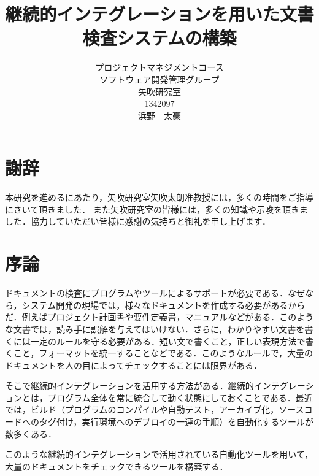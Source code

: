 \title{継続的インテグレーションを用いた文書検査システムの構築}
\author{プロジェクトマネジメントコース\\
ソフトウェア開発管理グループ\\
矢吹研究室\\
1342097\\
浜野　太豪}
\date{}

\maketitle



\chapter*{謝辞}

本研究を進めるにあたり，矢吹研究室矢吹太朗准教授には，多くの時間をご指導にさいて頂きました．
また矢吹研究室の皆様には，多くの知識や示唆を頂きました．協力していただい皆様に感謝の気持ちと御礼を申し上げます．

\tableofcontents%


\chapter{序論}
ドキュメントの検査にプログラムやツールによるサポートが必要である．なぜなら，システム開発の現場では，様々なドキュメントを作成する必要があるからだ．例えばプロジェクト計画書や要件定義書，マニュアルなどがある．このような文書では，読み手に誤解を与えてはいけない．さらに，わかりやすい文書を書くには一定のルールを守る必要がある．短い文で書くこと，正しい表現方法で書くこと，フォーマットを統一することなどである．このようなルールで，大量のドキュメントを人の目によってチェックすることには限界がある．

そこで継続的インテグレーションを活用する方法がある．継続的インテグレーションとは，プログラム全体を常に統合して動く状態にしておくことである．最近では，ビルド（プログラムのコンパイルや自動テスト，アーカイブ化，ソースコードへのタグ付け，実行環境へのデプロイの一連の手順）を自動化するツールが数多くある\cite{5}．

このような継続的インテグレーションで活用されている自動化ツールを用いて，大量のドキュメントをチェックできるツールを構築する．









